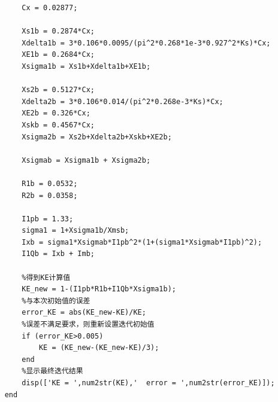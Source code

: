 \documentclass[a4paper,11pt]{ctexart}
\begin{document}
\begin{spacing}{1.5}
\begin{lstlisting}
		Cx = 0.02877;

		Xs1b = 0.2874*Cx;
		Xdelta1b = 3*0.106*0.0095/(pi^2*0.268*1e-3*0.927^2*Ks)*Cx;
		XE1b = 0.2684*Cx;
		Xsigma1b = Xs1b+Xdelta1b+XE1b;

		Xs2b = 0.5127*Cx;
		Xdelta2b = 3*0.106*0.014/(pi^2*0.268e-3*Ks)*Cx;
		XE2b = 0.326*Cx;
		Xskb = 0.4567*Cx;
		Xsigma2b = Xs2b+Xdelta2b+Xskb+XE2b;
	
		Xsigmab = Xsigma1b + Xsigma2b;

		R1b = 0.0532;
		R2b = 0.0358;

		I1pb = 1.33;
		sigma1 = 1+Xsigma1b/Xmsb;
		Ixb = sigma1*Xsigmab*I1pb^2*(1+(sigma1*Xsigmab*I1pb)^2);
		I1Qb = Ixb + Imb;

		%得到KE计算值
		KE_new = 1-(I1pb*R1b+I1Qb*Xsigma1b);
		%与本次初始值的误差
		error_KE = abs(KE_new-KE)/KE;
		%误差不满足要求，则重新设置迭代初始值
		if (error_KE>0.005)
			KE = (KE_new-(KE_new-KE)/3);
		end
		%显示最终迭代结果
		disp(['KE = ',num2str(KE),'  error = ',num2str(error_KE)]);
	end


\end{lstlisting}

\end{spacing}
\end{document}
